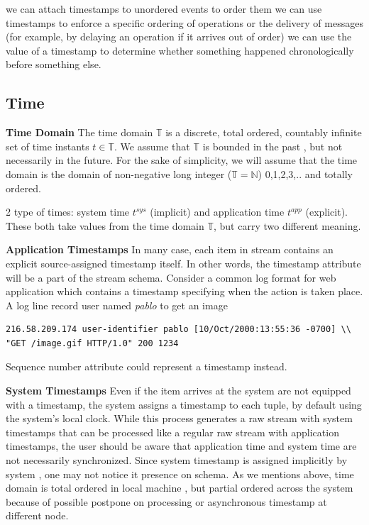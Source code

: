 we can attach timestamps to unordered events to order them
we can use timestamps to enforce a specific ordering of operations or the delivery of messages (for example, by delaying an operation if it arrives out of order)
we can use the value of a timestamp to determine whether something happened chronologically before something else.

\subsection*{Time}
\textbf{Time Domain} The time domain $\mathbb{T}$ is a discrete, total ordered, countably infinite set of time instants $t \in \mathbb{T}$. We assume that $\mathbb{T}$ is bounded in the past , but not necessarily in the future. For the sake of simplicity, we will assume that the time domain is the domain of non-negative long integer ($\mathbb{T} = \mathbb{N}$) {0,1,2,3,..}\citep{Dindar:2013} and totally ordered. 

2 type of times: system time $t^{sys}$ (implicit) and application time $t^{app}$ (explicit). These both take values from the time domain $\mathbb{T}$, but carry two different meaning. 

\textbf{Application Timestamps} In many case, each item in stream contains an explicit source-assigned timestamp itself. In other words, the timestamp attribute will be a part of the stream schema. Consider  a common log format for web application which contains a timestamp specifying when the action is taken place. 
A log line record user named \textit{pablo} to get an image
\begin{verbatim}
216.58.209.174 user-identifier pablo [10/Oct/2000:13:55:36 -0700] \\
"GET /image.gif HTTP/1.0" 200 1234
\end{verbatim}
Sequence number attribute could represent a timestamp instead.

\textbf{System Timestamps} Even if the item arrives at the system are not equipped with a timestamp, the system assigns a timestamp to each tuple, by default using the system’s local clock. While this process generates a raw stream with system timestamps that can be processed like a regular raw stream with application timestamps, the user should be aware that application time and system time are not necessarily synchronized\citep{Kramer:2009}. Since system timestamp is assigned implicitly by system , one may not notice it presence on schema. As we mentions above, time domain is total ordered in local machine , but partial ordered across the system because of possible postpone on processing or asynchronous timestamp at different node.


